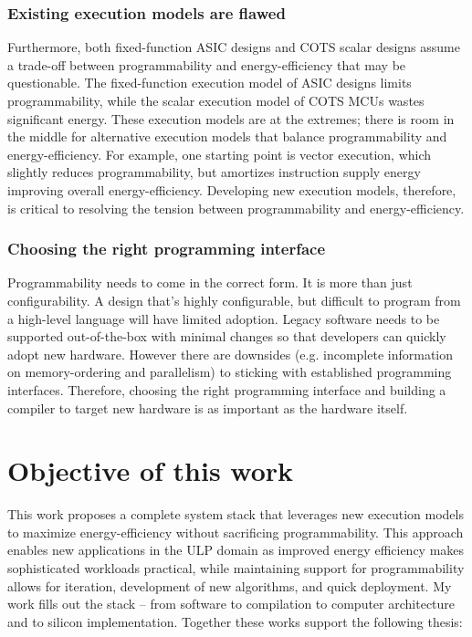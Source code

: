 \subsubsection{Existing execution models are flawed}
Furthermore, both fixed-function ASIC designs and COTS scalar designs assume a trade-off between programmability and energy-efficiency that may be questionable.
% 
The fixed-function execution model of ASIC designs limits programmability, while the scalar execution model of COTS MCUs wastes significant energy.
% 
These execution models are at the extremes; there is room in the middle for alternative execution models that balance programmability and energy-efficiency.
% 
For example, one starting point is vector execution, which slightly reduces programmability, but amortizes instruction supply energy improving overall energy-efficiency.
% 
Developing new execution models, therefore, is critical to resolving the tension between programmability and energy-efficiency.

\subsubsection{Choosing the right programming interface}
Programmability needs to come in the correct form.
% 
It is more than just configurability.
% 
A design that's highly configurable, but difficult to program from a high-level language will have limited adoption.
% 
Legacy software needs to be supported out-of-the-box with minimal changes so that developers can quickly adopt new hardware.
% 
However there are downsides (e.g. incomplete information on memory-ordering and parallelism) to sticking with established programming interfaces.
% 
Therefore, choosing the right programming interface and building a compiler to target new hardware is as important as the hardware itself.


\figOverview

\section{Objective of this work}

This work proposes a complete system stack that leverages new execution models to maximize energy-efficiency without sacrificing programmability.
% 
This approach enables new applications in the ULP domain as improved energy efficiency makes sophisticated workloads practical, while maintaining support for programmability allows for iteration, development of new algorithms, and quick deployment. 
% 
My work fills out the stack -- from software to compilation to computer architecture and to silicon implementation.
% 
Together these works support the following thesis:


